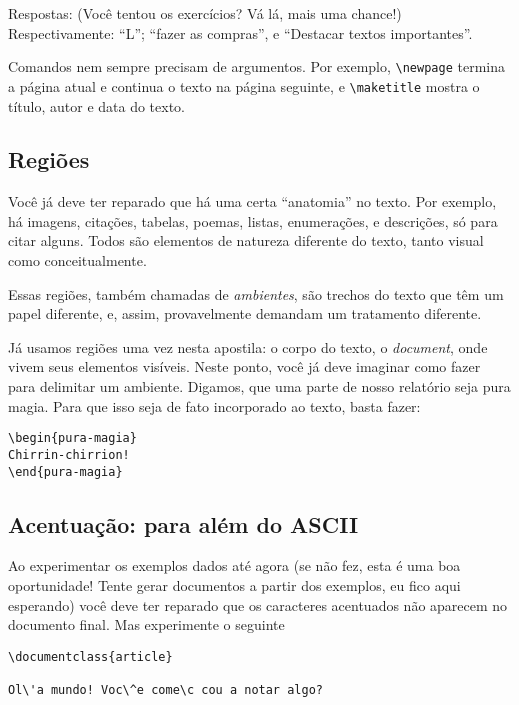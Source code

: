 Respostas: (Você tentou os exercícios? Vá lá, mais uma chance!)
Respectivamente: ``L''; ``fazer as compras'', e ``Destacar textos {importantes}''.

Comandos nem sempre precisam de argumentos. Por exemplo,
\verb!\newpage! termina a página atual e continua o texto na página
seguinte, e \verb!\maketitle! mostra o título, autor e data do texto.

\subsection{Regiões}

Você já deve ter reparado que há uma certa ``anatomia'' no
texto. Por exemplo, há imagens, citações, tabelas, poemas, listas,
enumerações, e descrições, só para citar alguns. Todos são 
elementos de natureza diferente do texto, tanto visual como
conceitualmente.

Essas regiões, também chamadas de \emph{ambientes}, são trechos do
texto que têm um papel diferente, e, assim, provavelmente demandam um
tratamento diferente.

Já usamos regiões uma vez nesta apostila: o corpo do texto, o
\emph{document}, onde vivem seus elementos visíveis. Neste ponto, você
já deve imaginar como fazer para delimitar um ambiente. Digamos, que
uma parte de nosso relatório seja pura magia. Para que isso seja de
fato incorporado ao texto, basta fazer:

\begin{footnotesize}
\begin{verbatim}
\begin{pura-magia}
Chirrin-chirrion!
\end{pura-magia}
\end{verbatim}
\end{footnotesize}


\subsection{Acentuação: para além do ASCII}\label{subsec:ascii}

Ao experimentar os exemplos dados até agora (se não fez, esta é uma
boa oportunidade! Tente gerar documentos a partir dos exemplos, eu
fico aqui esperando) você deve ter reparado que os caracteres
acentuados não aparecem no documento final. Mas experimente o seguinte
\begin{footnotesize}
\begin{verbatim}
\documentclass{article}

Ol\'a mundo! Voc\^e come\c cou a notar algo?

\end{verbatim}
\end{footnotesize}

